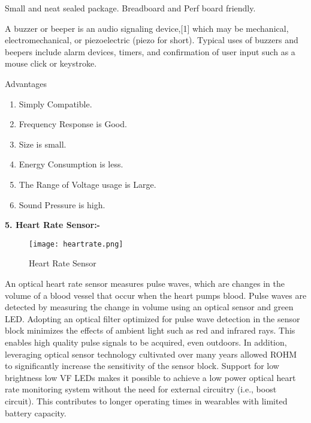 \documentclass[12pt,a4paper]{report}
\begin{document}
\noindent Small and neat sealed package. Breadboard and Perf board friendly.

\noindent A buzzer or beeper is an audio signaling device,[1] which may be mechanical, electromechanical, or piezoelectric (piezo for short). Typical uses of buzzers and beepers include alarm devices, timers, and confirmation of user input such as a mouse click or keystroke.

\noindent Advantages 

\begin{enumerate}
\item  Simply Compatible.

\item  Frequency Response is Good.

\item  Size is small.

\item  Energy Consumption is less.

\item  The Range of Voltage usage is Large.

\item  Sound Pressure is high.
\end{enumerate}

\noindent 

\noindent 

\noindent \textbf{5. Heart Rate Sensor:-}
\newline
\begin{figure}[htp]
    \texttt{[image: heartrate.png]}
    \caption{Heart Rate Sensor }
\end{figure}

\noindent \textbf{}

\noindent An optical heart rate sensor measures pulse waves, which are changes in the volume of a blood vessel that occur when the heart pumps blood. Pulse waves are detected by measuring the change in volume using an optical sensor and green LED. Adopting an optical filter optimized for pulse wave detection in the sensor block minimizes the effects of ambient light such as red and infrared rays. This enables high quality pulse signals to be acquired, even outdoors. In addition, leveraging optical sensor technology cultivated over many years allowed ROHM to significantly increase the sensitivity of the sensor block. Support for low brightness low VF LEDs makes it possible to achieve a low power optical heart rate monitoring system without the need for external circuitry (i.e., boost circuit). This contributes to longer operating times in wearables with limited battery capacity.
\end{document}
